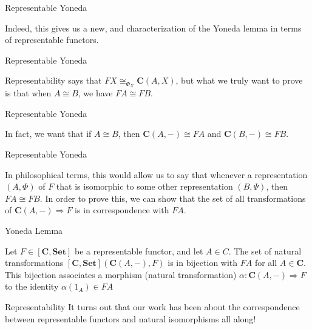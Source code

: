 \documentclass[tikz]{beamer}
\theoremstyle{definition}
\newcommand{\cat}[1]{\mathbf{#1}}
\begin{document}
\begin{frame}{Representable Yoneda}

Indeed, this gives us a new, and  characterization of the Yoneda lemma in terms of representable functors.

\end{frame}

\begin{frame}{Representable Yoneda}

Representability says that $FX \cong_{\Phi_X} \cat{C}(A,X)$, but what we truly want to prove is that when $ A \cong B$, we have $FA \cong FB$.

\end{frame}

\begin{frame}{Representable Yoneda}

In fact, we want that if $A \cong B$, then $\cat{C}(A,-) \cong FA$ and  $\cat{C}(B,-) \cong FB$.

\end{frame}

\begin{frame}{Representable Yoneda}

In philosophical terms, this would allow us to say that whenever a representation $(A, \Phi)$ of $F$ that is isomorphic to some other representation $(B, \Psi)$, then $FA \cong FB$. In order to prove this, we can show that the set of all transformations of $\cat{C}(A,-) \Rightarrow F$ is in correspondence with $FA$.

\end{frame}

\begin{frame}{Yoneda Lemma}

    \begin{definition}
        Let $F \in [\mathbf{C}, \mathbf{Set}]$ be a representable functor, and let $A \in C$. The set of natural transformations $[\mathbf{C}, \mathbf{Set}](\mathbf{C}(A,-), F)$ is in bijection with $FA$ for all $A \in \mathbf{C}$. This bijection associates a morphism (natural transformation) $\alpha: \mathbf{C}(A,-) \Rightarrow F$ to the identity $\alpha(1_A) \in FA$
    \end{definition}{}
\end{frame}

\begin{frame}{Representability}
    It turns out that our work has been about the correspondence between representable functors and natural isomorphisms all along!
\end{frame}{}
\end{document}
